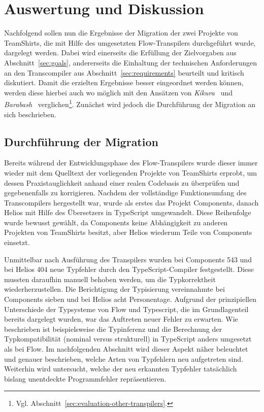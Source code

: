 \chapter{Auswertung und Diskussion}
\label{chap:evaluation}

Nachfolgend sollen nun die Ergebnisse der Migration der zwei Projekte von TeamShirts, die mit Hilfe des umgesetzten Flow-Transpilers durchgeführt wurde, dargelegt werden. Dabei wird einerseits die Erfüllung der Zielvorgaben aus Abschnitt~\ref{sec:goals}, andererseits die Einhaltung der technischen Anforderungen an den Transcompiler aus Abschnitt~\ref{sec:requirements} beurteilt und kritisch diskutiert. Damit die erzielten Ergebnisse besser eingeordnet werden können, werden diese hierbei auch wo möglich mit den Ansätzen von \textit{Kikura}~\autocite{KIKURA:FLOW_TO_TS} und \textit{Barabash}~\autocite{BARABASH:FLOW_TO_TS} verglichen\footnote{Vgl. Abschnitt~\ref{sec:evaluation-other-transpilers}.}. Zunächst wird jedoch die Durchführung der Migration an sich beschrieben.

\section{Durchführung der Migration}

Bereits während der Entwicklungsphase des Flow-Transpilers wurde dieser immer wieder mit dem Quelltext der vorliegenden Projekte von TeamShirts erprobt, um dessen Praxistauglichkeit anhand einer realen Codebasis zu überprüfen und gegebenenfalls zu korrigieren. Nachdem der vollständige Funktionsumfang des Transcompilers hergestellt war, wurde als erstes das Projekt Components, danach Helios mit Hilfe des Übersetzers in TypeScript umgewandelt. Diese Reihenfolge wurde bewusst gewählt, da Components keine Abhängigkeit zu anderen Projekten von TeamShirts besitzt, aber Helios wiederum Teile von Components einsetzt.

Unmittelbar nach Ausführung des Transpilers wurden bei Components 543 und bei Helios 404 neue Typfehler durch den TypeScript-Compiler festgestellt. Diese mussten daraufhin manuell behoben werden, um die Typkorrektheit wiederherzustellen. Die Berichtigung der Typisierung vereinnahmte bei Components sieben und bei Helios acht Personentage. Aufgrund der prinzipiellen Unterschiede der Typsysteme von Flow und Typescript, die im Grundlagenteil bereits dargelegt wurden, war das Auftreten neuer Fehler zu erwarten. Wie beschrieben ist beispielsweise die Typinferenz und die Berechnung der Typkompatibilität (nominal versus strukturell) in TypeScript anders umgesetzt als bei Flow. Im nachfolgenden Abschnitt wird dieser Aspekt näher beleuchtet und genauer beschrieben, welche Arten von Typfehlern neu aufgetreten sind. Weiterhin wird untersucht, welche der neu erkannten Typfehler tatsächlich bislang unentdeckte Programmfehler repräsentieren.

